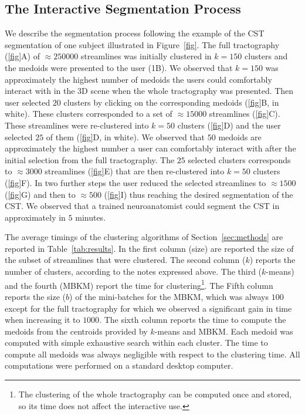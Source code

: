 \subsection{The Interactive Segmentation Process}
We describe the segmentation process following the example of the CST
segmentation of one subject illustrated in Figure~\ref{fig}. The full
tractography (\ref{fig}A) of $\approx 250000$ streamlines was
initially clustered in $k=150$ clusters and the medoids were presented
to the user (1B). We observed that $k=150$ was approximately the
highest number of medoids the users could comfortably interact with in
the $3$D scene when the whole tractography was presented. Then user
selected $20$ clusters by clicking on the corresponding medoids
(\ref{fig}B, in white). These clusters corresponded to a set of
$\approx 15000$ streamlines (\ref{fig}C). These streamlines were
re-clustered into $k=50$ clusters (\ref{fig}D) and the user selected
$25$ of them (\ref{fig}D, in white). We observed that $50$ medoids are
approximately the highest number a user can comfortably interact with
after the initial selection from the full tractography. The $25$
selected clusters corresponds to $\approx 3000$ streamlines
(\ref{fig}E) that are then re-clustered into $k=50$ clusters
(\ref{fig}F). In two further steps the user reduced the selected
streamlines to $\approx 1500$ (\ref{fig}G) and then to $\approx 500$
(\ref{fig}I) thus reaching the desired segmentation of the CST. We
observed that a trained neuroanatomist could segment the CST in
approximately in $5$ minutes.

The average timings of the clustering algorithms of
Section~\ref{sec:methods} are reported in Table~\ref{tab:results}. In
the first column (size) are reported the size of the subset of
streamlines that were clustered. The second column ($k$) reports the
number of clusters, according to the notes expressed above. The third
($k$-means) and the fourth (MBKM) report the time for
clustering\footnote{The clustering of the whole tractography can be
  computed once and stored, so its time does not affect the
  interactive use.}. The Fifth column reports the size ($b$) of the
mini-batches for the MBKM, which was always $100$ except for the full
tractography for which we observed a significant gain in time when
increasing it to $1000$. The sixth column reports the time to compute
the medoids from the centroids provided by $k$-means and MBKM. Each
medoid was computed with simple exhaustive search within each
cluster. The time to compute all medoids was always negligible with
respect to the clustering time. All computations were performed on a
standard desktop computer.

